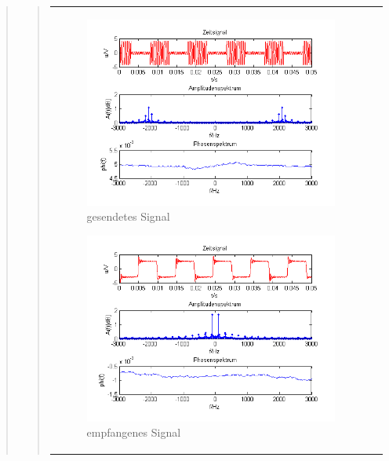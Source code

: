\begin{quote}
\begin{quote}
\begin{center}
\begin{tabular}{ll}
\begin{minipage}{0.6\textwidth}
                \begin{figure}[H]
                    \label{fig:DemodreieckmT}
                    \includegraphics[scale=0.7]{Bilder/Am_Rec_2k_100Hz_mo}
                    \caption{gesendetes Signal}
                \end{figure}
        
            \end{minipage}
        
            \begin{minipage}{0.6\textwidth}
                \begin{figure}[H]
                    \label{fig:DemodreieckmT2}
                    \includegraphics[scale=0.7]{Bilder/Demo_Rec_2k_100Hz_mo_mitTiefpass}
                    \caption{empfangenes Signal}
                \end{figure}
        
            \end{minipage}
        
        \end{tabular}
        \end{center}
        
    \end{quote}
    
\end{quote}


